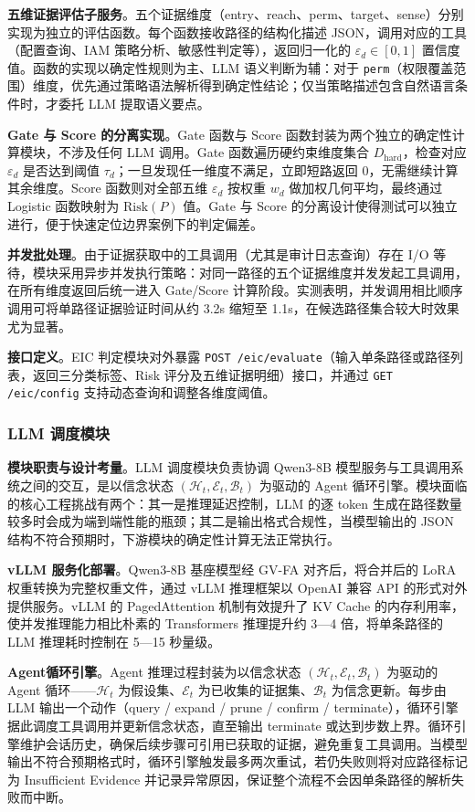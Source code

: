 \documentclass[a4paper,12pt]{ctexart}
\begin{document}
\textbf{五维证据评估子服务}。五个证据维度（entry、reach、perm、target、sense）分别实现为独立的评估函数。每个函数接收路径的结构化描述 JSON，调用对应的工具（配置查询、IAM 策略分析、敏感性判定等），返回归一化的 $\varepsilon_d \in [0, 1]$ 置信度值。函数的实现以确定性规则为主、LLM 语义判断为辅：对于 \texttt{perm}（权限覆盖范围）维度，优先通过策略语法解析得到确定性结论；仅当策略描述包含自然语言条件时，才委托 LLM 提取语义要点。

\textbf{Gate 与 Score 的分离实现}。Gate 函数与 Score 函数封装为两个独立的确定性计算模块，不涉及任何 LLM 调用。Gate 函数遍历硬约束维度集合 $D_\text{hard}$，检查对应 $\varepsilon_d$ 是否达到阈值 $\tau_d$；一旦发现任一维度不满足，立即短路返回 0，无需继续计算其余维度。Score 函数则对全部五维 $\varepsilon_d$ 按权重 $w_d$ 做加权几何平均，最终通过 Logistic 函数映射为 $\mathrm{Risk}(P)$ 值。Gate 与 Score 的分离设计使得测试可以独立进行，便于快速定位边界案例下的判定偏差。

\textbf{并发批处理}。由于证据获取中的工具调用（尤其是审计日志查询）存在 I/O 等待，模块采用异步并发执行策略：对同一路径的五个证据维度并发发起工具调用，在所有维度返回后统一进入 Gate/Score 计算阶段。实测表明，并发调用相比顺序调用可将单路径证据验证时间从约 3.2s 缩短至 1.1s，在候选路径集合较大时效果尤为显著。

\textbf{接口定义}。EIC 判定模块对外暴露 \texttt{POST /eic/evaluate}（输入单条路径或路径列表，返回三分类标签、Risk 评分及五维证据明细）接口，并通过 \texttt{GET /eic/config} 支持动态查询和调整各维度阈值。

\subsubsection{LLM 调度模块}

\textbf{模块职责与设计考量}。LLM 调度模块负责协调 Qwen3-8B 模型服务与工具调用系统之间的交互，是以信念状态 $(\mathcal{H}_t, \mathcal{E}_t, \mathcal{B}_t)$ 为驱动的 Agent 循环引擎。模块面临的核心工程挑战有两个：其一是推理延迟控制，LLM 的逐 token 生成在路径数量较多时会成为端到端性能的瓶颈；其二是输出格式合规性，当模型输出的 JSON 结构不符合预期时，下游模块的确定性计算无法正常执行。

\textbf{vLLM 服务化部署}。Qwen3-8B 基座模型经 GV-FA 对齐后，将合并后的 LoRA 权重转换为完整权重文件，通过 vLLM 推理框架以 OpenAI 兼容 API 的形式对外提供服务。vLLM 的 PagedAttention 机制有效提升了 KV Cache 的内存利用率，使并发推理能力相比朴素的 Transformers 推理提升约 3—4 倍，将单条路径的 LLM 推理耗时控制在 5—15 秒量级。

\textbf{Agent循环引擎}。Agent 推理过程封装为以信念状态 $(\mathcal{H}_t, \mathcal{E}_t, \mathcal{B}_t)$ 为驱动的 Agent 循环——$\mathcal{H}_t$ 为假设集、$\mathcal{E}_t$ 为已收集的证据集、$\mathcal{B}_t$ 为信念更新。每步由 LLM 输出一个动作（query / expand / prune / confirm / terminate），循环引擎据此调度工具调用并更新信念状态，直至输出 terminate 或达到步数上界。循环引擎维护会话历史，确保后续步骤可引用已获取的证据，避免重复工具调用。当模型输出不符合预期格式时，循环引擎触发最多两次重试，若仍失败则将对应路径标记为 Insufficient Evidence 并记录异常原因，保证整个流程不会因单条路径的解析失败而中断。
\end{document}
